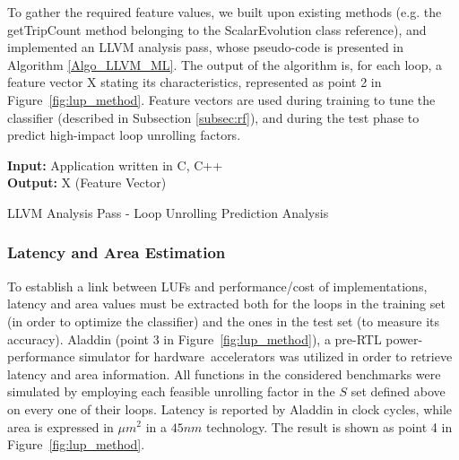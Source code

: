 \documentclass[]{usiinfthesis}
\newcommand{\HW}{{hardware}}
\begin{document}
To gather the required feature values, we built upon existing methods
(e.g. the getTripCount method belonging to the ScalarEvolution class
reference), and implemented an LLVM analysis pass, whose pseudo-code
is presented in Algorithm \ref{Algo_LLVM_ML}. The output of the algorithm
is, for each loop, a feature vector X stating its characteristics,
represented as point 2 in Figure~\ref{fig:lup_method}. Feature vectors
are used during training to tune the classifier (described in Subsection
\ref{subsec:rf}), and during the test phase to predict high-impact
loop unrolling factors.

\begin{algorithm}[t]
\begin{flushleft}
\textbf{Input:}  Application written in C, C++\\
\textbf{Output:} X (Feature Vector)\\
\end{flushleft}
\begin{algorithmic}[1]
 { }
     {}
    \EndIf
  \EndFor
\EndFunction
\State
{}
   {}
   {}
\EndFunction
\end{algorithmic}
\caption{LLVM Analysis Pass - Loop Unrolling Prediction Analysis} 
\label{Algo_LLVM_ML}

\end{algorithm}

\subsubsection{Latency and Area Estimation}
\label{sec:ml_la}

To establish a link between LUFs and performance/cost of
implementations, latency and area values must be extracted both for
the loops in the training set (in order to optimize the classifier)
and the ones in the test set (to measure its accuracy).%
Aladdin \cite{ShaoJul14} (point 3 in
Figure~\ref{fig:lup_method}), a pre-RTL power-performance simulator
for \HW\ accelerators was utilized in order to retrieve latency and area 
information. All functions in the considered benchmarks were
simulated by employing each feasible unrolling factor in the $S$ set 
defined above on every one of their loops.  
Latency is reported by Aladdin in clock cycles,
while area is expressed in $\mu m^2$ in a $45nm$ technology. The
result is shown as point 4 in Figure~\ref{fig:lup_method}.
\par
\end{document}
